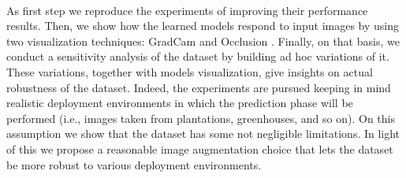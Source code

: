 \\\indent
As first step we reproduce the experiments of \cite{ref11} improving their performance results. Then, we show how the learned models respond to input images by using two visualization techniques: GradCam \cite{ref12} and Occlusion \cite{ref13}. Finally, on that basis, we conduct a sensitivity analysis of the dataset by building ad hoc variations of it. These variations, together with models visualization, give insights on actual robustness of the dataset. Indeed, the experiments are pursued keeping in mind realistic deployment environments in which the prediction phase will be performed (i.e., images taken from plantations, greenhouses, and so on). On this assumption we show that the dataset has some not negligible limitations. In light of this we propose a reasonable image augmentation choice that lets the dataset be more robust to various deployment environments.